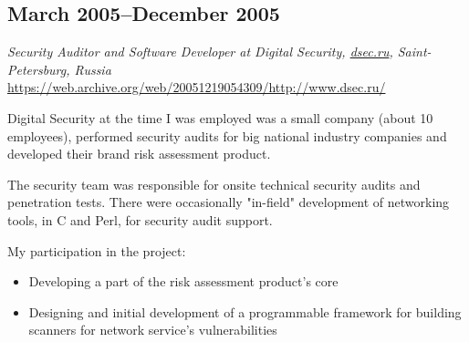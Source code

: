 \subsection*{March 2005--December 2005}

\textit{Security Auditor and Software Developer at Digital Security,
\href{https://dsec.ru}{\url{dsec.ru}}, Saint-Petersburg, Russia}
\href{https://web.archive.org/web/20051219054309/http://www.dsec.ru/}{\url{https://web.archive.org/web/20051219054309/http://www.dsec.ru/}}

Digital Security at the time I was employed was a small company (about
10 employees), performed security audits for big national industry
companies and developed their brand risk assessment product.

The security team was responsible for onsite technical security audits
and penetration tests. There were occasionally "in-field" development of
networking tools, in C and Perl, for security audit support.

My participation in the project:
\begin{itemize}[noitemsep, nosep]
  \item Developing a part of the risk assessment product's core
  \item Designing and initial development of a programmable
framework for building scanners for network service's vulnerabilities
\end{itemize}

